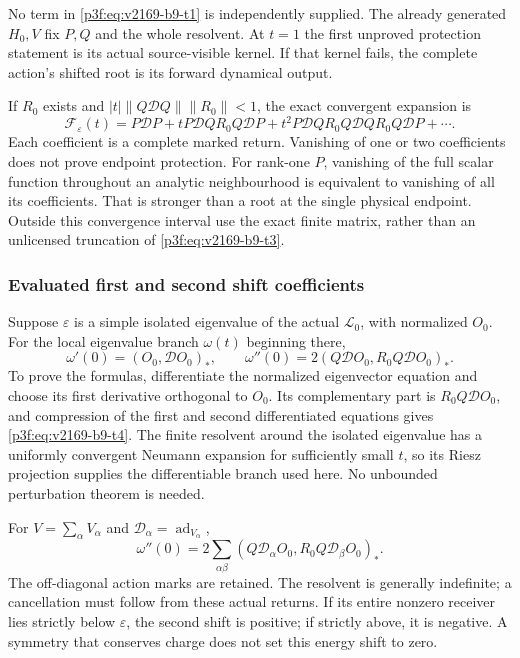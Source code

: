 \documentclass[11pt,a4paper]{article}
\begin{document}
No term in \eqref{p3f:eq:v2169-b9-t1} is independently supplied. The already generated $H_0,V$
fix $P,Q$ and the whole resolvent. At $t=1$ the first unproved protection
statement is its actual source-visible kernel. If that kernel fails, the
complete action's shifted root is its forward dynamical output.

If $R_0$ exists and $|t|\|Q\mathcal DQ\|\|R_0\|<1$, the exact convergent
expansion is
\begin{equation}
 \mathcal F_\varepsilon(t)=P\mathcal DP
 +tP\mathcal DQ R_0Q\mathcal DP
 +t^2P\mathcal DQ R_0Q\mathcal DQ R_0Q\mathcal DP+\cdots.
 \label{p3f:eq:v2169-b9-t3}
\end{equation}
Each coefficient is a complete marked return. Vanishing of one or two
coefficients does not prove endpoint protection. For rank-one $P$, vanishing
of the full scalar function throughout an analytic neighbourhood is equivalent
to vanishing of all its coefficients. That is stronger than a root at the
single physical endpoint. Outside this convergence interval use the exact
finite matrix, rather than an unlicensed truncation of \eqref{p3f:eq:v2169-b9-t3}.

\subsubsection{Evaluated first and second shift coefficients}
Suppose $\varepsilon$ is a simple isolated eigenvalue of the actual
$\mathcal L_0$, with normalized $O_0$. For the local eigenvalue branch
$\omega(t)$ beginning there,
\begin{equation}
 \boxed{\omega'(0)=(O_0,\mathcal DO_0)_*,\qquad
 \omega''(0)=2(Q\mathcal DO_0,R_0Q\mathcal DO_0)_*.}
 \label{p3f:eq:v2169-b9-t4}
\end{equation}
To prove the formulas, differentiate the normalized eigenvector equation
and choose its first derivative orthogonal to $O_0$.
Its complementary part is $R_0Q\mathcal DO_0$, and compression of the first
and second differentiated equations gives \eqref{p3f:eq:v2169-b9-t4}. The finite resolvent around
the isolated eigenvalue has a uniformly convergent Neumann expansion for
sufficiently small $t$, so its Riesz projection supplies the differentiable
branch used here. No unbounded perturbation theorem is needed.

For $V=\sum_\alpha V_\alpha$ and $\mathcal D_\alpha=\operatorname{ad}_{V_\alpha}$,
\begin{equation}
 \boxed{\omega''(0)=2\sum_{\alpha\beta}
 (Q\mathcal D_\alpha O_0,R_0Q\mathcal D_\beta O_0)_*.}
 \label{p3f:eq:v2169-b9-t5}
\end{equation}
The off-diagonal action marks are retained. The resolvent is generally
indefinite; a cancellation must follow from these actual returns.
If its entire nonzero receiver lies strictly below $\varepsilon$, the
second shift is positive; if strictly above, it is negative. A symmetry
that conserves charge does not set this energy shift to zero.
\end{document}
